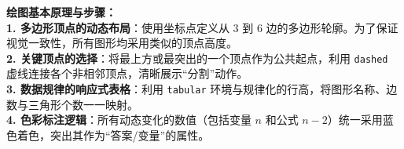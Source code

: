\vspace{0.6cm}

{\small\color{blue!70!black}
\textbf{绘图基本原理与步骤：}\\
\textbf{1. 多边形顶点的动态布局}：使用坐标点定义从 $3$ 到 $6$ 边的多边形轮廓。为了保证视觉一致性，所有图形均采用类似的顶点高度。\\
\textbf{2. 关键顶点的选择}：将最上方或最突出的一个顶点作为公共起点，利用 \texttt{dashed} 虚线连接各个非相邻顶点，清晰展示“分割”动作。\\
\textbf{3. 数据规律的响应式表格}：利用 \texttt{tabular} 环境与规律化的行高，将图形名称、边数与三角形个数一一映射。\\
\textbf{4. 色彩标注逻辑}：所有动态变化的数值（包括变量 $n$ 和公式 $n-2$）统一采用蓝色着色，突出其作为“答案/变量”的属性。
}



\newpage
